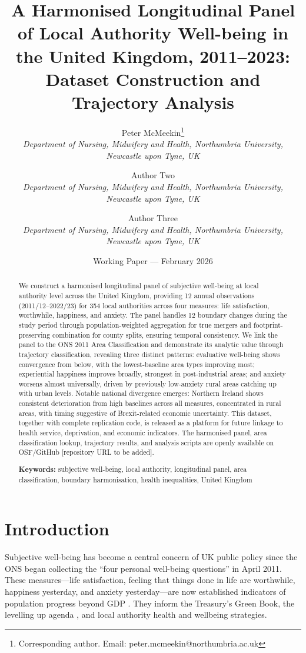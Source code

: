 \documentclass[12pt,a4paper]{article}
\title{A Harmonised Longitudinal Panel of Local Authority Well-being in the United Kingdom, 2011–2023:\\
Dataset Construction and Trajectory Analysis}
\author{
Peter McMeekin\thanks{Corresponding author. Email: peter.mcmeekin@northumbria.ac.uk}\\
\textit{Department of Nursing, Midwifery and Health, Northumbria University, Newcastle upon Tyne, UK}
\and
Author Two\\
\textit{Department of Nursing, Midwifery and Health, Northumbria University, Newcastle upon Tyne, UK}
\and
Author Three\\
\textit{Department of Nursing, Midwifery and Health, Northumbria University, Newcastle upon Tyne, UK}
}
\date{Working Paper --- February 2026}
\begin{document}
\maketitle

\begin{abstract}
\noindent We construct a harmonised longitudinal panel of subjective well-being at local authority level across the United Kingdom, providing 12 annual observations (2011/12--2022/23) for 354 local authorities across four measures: life satisfaction, worthwhile, happiness, and anxiety. The panel handles 12 boundary changes during the study period through population-weighted aggregation for true mergers and footprint-preserving combination for county splits, ensuring temporal consistency. We link the panel to the ONS 2011 Area Classification and demonstrate its analytic value through trajectory classification, revealing three distinct patterns: evaluative well-being shows convergence from below, with the lowest-baseline area types improving most; experiential happiness improves broadly, strongest in post-industrial areas; and anxiety worsens almost universally, driven by previously low-anxiety rural areas catching up with urban levels. Notable national divergence emerges: Northern Ireland shows consistent deterioration from high baselines across all measures, concentrated in rural areas, with timing suggestive of Brexit-related economic uncertainty. This dataset, together with complete replication code, is released as a platform for future linkage to health service, deprivation, and economic indicators. The harmonised panel, area classification lookup, trajectory results, and analysis scripts are openly available on OSF/GitHub [repository URL to be added].

\medskip
\noindent\textbf{Keywords:} subjective well-being, local authority, longitudinal panel, area classification, boundary harmonisation, health inequalities, United Kingdom
\end{abstract}

\section{Introduction}

Subjective well-being has become a central concern of UK public policy since the ONS began collecting the ``four personal well-being questions'' in April 2011. These measures---life satisfaction, feeling that things done in life are worthwhile, happiness yesterday, and anxiety yesterday---are now established indicators of population progress beyond GDP . They inform the Treasury's Green Book, the levelling up agenda , and local authority health and wellbeing strategies.
\end{document}
